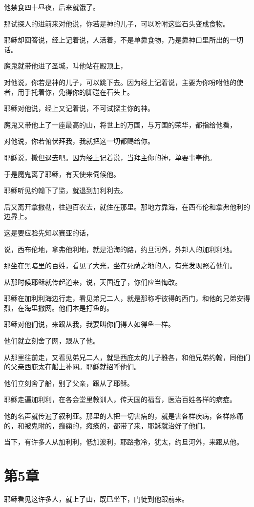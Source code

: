 \documentclass[12pt,oneside]{book}
\begin{document}
他禁食四十昼夜，后来就饿了。

那试探人的进前来对他说，你若是神的儿子，可以吩咐这些石头变成食物。

耶稣却回答说，经上记着说，人活着，不是单靠食物，乃是靠神口里所出的一切话。

魔鬼就带他进了圣城，叫他站在殿顶上，

对他说，你若是神的儿子，可以跳下去。因为经上记着说，主要为你吩咐他的使者，用手托着你，免得你的脚碰在石头上。

耶稣对他说，经上又记着说，不可试探主你的神。

魔鬼又带他上了一座最高的山，将世上的万国，与万国的荣华，都指给他看，

对他说，你若俯伏拜我，我就把这一切都赐给你。

耶稣说，撒但退去吧。因为经上记着说，当拜主你的神，单要事奉他。

于是魔鬼离了耶稣，有天使来伺候他。

耶稣听见约翰下了监，就退到加利利去。

后又离开拿撒勒，往迦百农去，就住在那里。那地方靠海，在西布伦和拿弗他利的边界上。

这是要应验先知以赛亚的话，

说，西布伦地，拿弗他利地，就是沿海的路，约旦河外，外邦人的加利利地。

那坐在黑暗里的百姓，看见了大光，坐在死荫之地的人，有光发现照着他们。

从那时候耶稣就传起道来，说，天国近了，你们应当悔改。

耶稣在加利利海边行走，看见弟兄二人，就是那称呼彼得的西门，和他的兄弟安得烈，在海里撒网。他们本是打鱼的。

耶稣对他们说，来跟从我，我要叫你们得人如得鱼一样。

他们就立刻舍了网，跟从了他。

从那里往前走，又看见弟兄二人，就是西庇太的儿子雅各，和他兄弟约翰，同他们的父亲西庇太在船上补网。耶稣就招呼他们。

他们立刻舍了船，别了父亲，跟从了耶稣。

耶稣走遍加利利，在各会堂里教训人，传天国的福音，医治百姓各样的病症。

他的名声就传遍了叙利亚。那里的人把一切害病的，就是害各样疾病，各样疼痛的，和被鬼附的，癫痫的，瘫痪的，都带了来，耶稣就治好了他们。

当下，有许多人从加利利，低加波利，耶路撒冷，犹太，约旦河外，来跟从他。

\chapter{第5章}
耶稣看见这许多人，就上了山，既已坐下，门徒到他跟前来。
\end{document}
